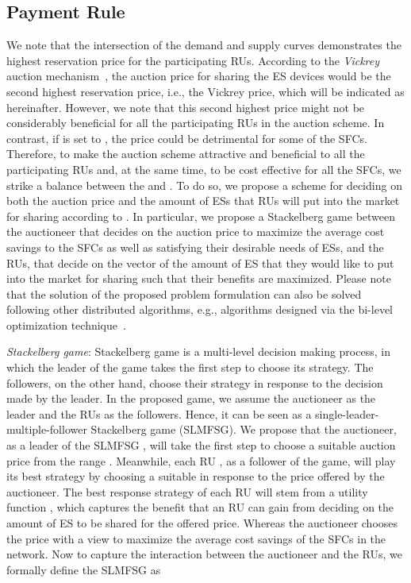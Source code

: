 \documentclass[journal,10pt]{IEEEtran}
\begin{document}
\subsection{Payment Rule}\label{sec:payment} We note that the intersection of the demand and supply curves demonstrates the highest reservation price  for the participating  RUs. According to the \emph{Vickrey} auction mechanism~\cite{Vickrey-JF:1961}, the auction price for sharing the ES devices would be the second highest reservation price, i.e., the Vickrey price, which will be indicated as  hereinafter. However, we note that this second highest price might not be considerably beneficial for all the participating RUs in the auction scheme. In contrast, if  is set to , the price could be detrimental for some of the SFCs. Therefore, to make the auction scheme attractive and beneficial to all the participating RUs and, at the same time, to be cost effective for all the SFCs, we strike a balance between the  and . To do so, we propose a scheme for deciding on both the auction price  and the amount of ESs  that RUs will put into the market for sharing according to . In particular, we propose a Stackelberg game between the auctioneer that decides on the auction price  to maximize the average cost savings to the SFCs as well as satisfying their desirable needs of ESs, and the RUs, that decide on the vector of the amount of ES  that they would like to put into the market for sharing such that their benefits are maximized. Please note that the solution of the proposed problem formulation can also be solved following other distributed algorithms, e.g., algorithms designed via the bi-level optimization technique~\cite{Oduguwa:2002}.

\emph{Stackelberg game}: Stackelberg game is a multi-level decision making process, in which the leader of the game takes the first step to choose its strategy. The followers, on the other hand, choose their strategy in response to the decision made by the leader. In the proposed game, we assume the auctioneer as the leader and the RUs as the followers. Hence, it can be seen as a single-leader-multiple-follower Stackelberg game (SLMFSG). We propose that the auctioneer, as a leader of the SLMFSG , will take the first step to choose a suitable auction price  from the range . Meanwhile, each RU , as a follower of the game, will play its best strategy by choosing a suitable  in response to the price  offered by the auctioneer. The best response strategy of each RU  will stem from a utility function , which captures the benefit that an RU  can gain from deciding on the amount of ES  to be shared for the offered price. Whereas the auctioneer chooses the price  with a view to maximize the average cost savings  of the SFCs in the network. Now to capture the interaction between the auctioneer and the RUs, we formally define the SLMFSG  as
\end{document}

